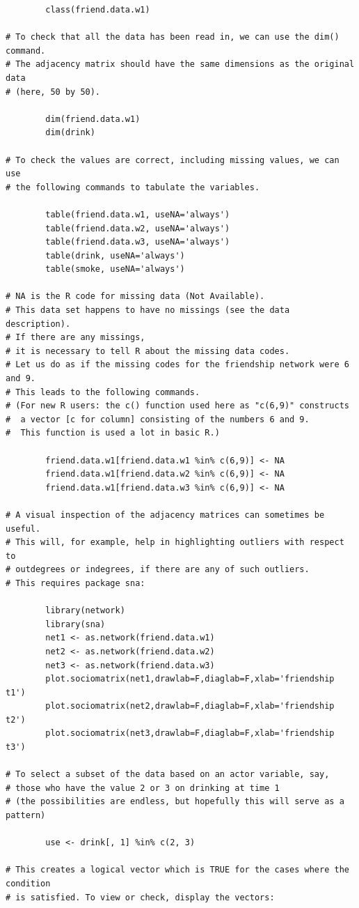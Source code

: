 \documentclass[a4paper,fleqn]{article}
\newcommand{\+}{\, + \,}
\begin{document}
{\begin{verbatim}
        class(friend.data.w1)

# To check that all the data has been read in, we can use the dim() command.
# The adjacency matrix should have the same dimensions as the original data
# (here, 50 by 50).

        dim(friend.data.w1)
        dim(drink)

# To check the values are correct, including missing values, we can use
# the following commands to tabulate the variables.

        table(friend.data.w1, useNA='always')
        table(friend.data.w2, useNA='always')
        table(friend.data.w3, useNA='always')
        table(drink, useNA='always')
        table(smoke, useNA='always')

# NA is the R code for missing data (Not Available).
# This data set happens to have no missings (see the data description).
# If there are any missings,
# it is necessary to tell R about the missing data codes.
# Let us do as if the missing codes for the friendship network were 6 and 9.
# This leads to the following commands.
# (For new R users: the c() function used here as "c(6,9)" constructs
#  a vector [c for column] consisting of the numbers 6 and 9.
#  This function is used a lot in basic R.)

        friend.data.w1[friend.data.w1 %in% c(6,9)] <- NA
        friend.data.w1[friend.data.w2 %in% c(6,9)] <- NA
        friend.data.w1[friend.data.w3 %in% c(6,9)] <- NA

# A visual inspection of the adjacency matrices can sometimes be useful.
# This will, for example, help in highlighting outliers with respect to
# outdegrees or indegrees, if there are any of such outliers.
# This requires package sna:

        library(network)
        library(sna)
        net1 <- as.network(friend.data.w1)
        net2 <- as.network(friend.data.w2)
        net3 <- as.network(friend.data.w3)
        plot.sociomatrix(net1,drawlab=F,diaglab=F,xlab='friendship t1')
        plot.sociomatrix(net2,drawlab=F,diaglab=F,xlab='friendship t2')
        plot.sociomatrix(net3,drawlab=F,diaglab=F,xlab='friendship t3')

# To select a subset of the data based on an actor variable, say,
# those who have the value 2 or 3 on drinking at time 1
# (the possibilities are endless, but hopefully this will serve as a pattern)

        use <- drink[, 1] %in% c(2, 3)

# This creates a logical vector which is TRUE for the cases where the condition
# is satisfied. To view or check, display the vectors:


\end{verbatim}}
\end{document}
